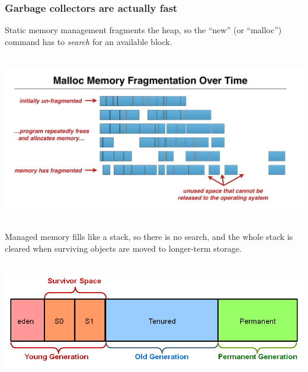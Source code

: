 \documentclass[compress]{beamer}
\begin{document}
\begin{frame}
\frametitle{Garbage collectors are actually fast}

Static memory management fragments the heap, so the ``new'' (or ``malloc'') command has to {\it search} for an available block.

\mbox{ } \hfill \includegraphics[width=0.7\linewidth]{PLOTS/malloc_memory_fragmentation.png} \hfill \mbox{ }

Managed memory fills like a stack, so there is no search, and the whole stack is cleared when surviving objects are moved to longer-term storage.

\mbox{ } \hfill \includegraphics[width=0.7\linewidth]{PLOTS/jvm_gc.png} \hfill \mbox{ }
\end{frame}
\end{document}
